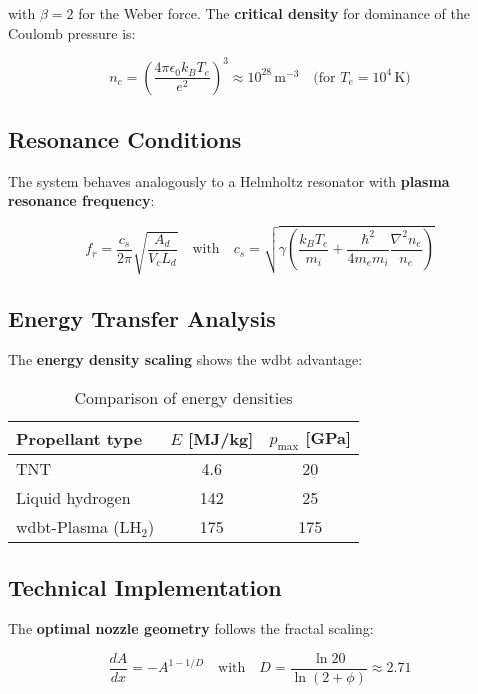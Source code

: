 with $\beta = 2$ for the Weber force. The \textbf{critical density} for dominance of the Coulomb pressure is:

\begin{equation}
n_c = \left(\frac{4\pi \epsilon_0 k_B T_e}{e^2}\right)^3 \approx 10^{28}\,\text{m}^{-3}\quad\text{(for }T_e=10^4\,\text{K)}
\end{equation}

\subsection{Resonance Conditions}
\label{subsec:resonanz}

The system behaves analogously to a Helmholtz resonator with \textbf{plasma resonance frequency}:

\begin{equation}
f_r = \frac{c_s}{2\pi}\sqrt{\frac{A_d}{V_c L_d}} \quad \text{with} \quad c_s = \sqrt{\gamma \left(\frac{k_B T_e}{m_i} + \frac{\hbar^2}{4m_e m_i}\frac{\nabla^2 n_e}{n_e}\right)}
\label{eq:resonanz}
\end{equation}

\subsection{Energy Transfer Analysis}
\label{subsec:energie}

The \textbf{energy density scaling} shows the \gls{wdbt} advantage:

\begin{table}[ht]
\centering
\caption{Comparison of energy densities}
\label{tab:energie}
\begin{tabular}{lcc}
\toprule
Propellant type & $E$ [MJ/kg] & $p_{\text{max}}$ [GPa] \\
\midrule
TNT & 4.6 & 20 \\
Liquid hydrogen & 142 & 25 \\
\gls{wdbt}-Plasma (LH$_2$) & 175 & 175 \\
\bottomrule
\end{tabular}
\end{table}

\subsection{Technical Implementation}
\label{subsec:tech}

The \textbf{optimal nozzle geometry} follows the fractal scaling:

\begin{equation}
\frac{dA}{dx} = -A^{1-1/D} \quad \text{with} \quad D = \frac{\ln 20}{\ln(2+\phi)} \approx 2.71
\label{eq:duese}
\end{equation}

